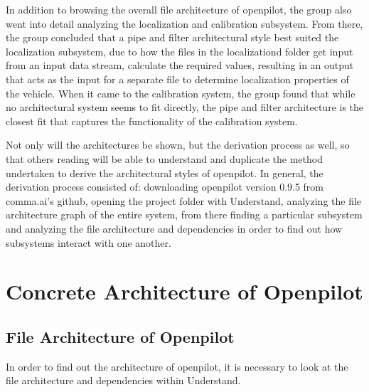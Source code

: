 \documentclass[12pt]{article}
\begin{document}
In addition to browsing the overall file architecture of openpilot, the group also went into detail analyzing the localization and calibration subsystem. From there, the group concluded that a pipe and filter architectural style best suited the localization subsystem, due to how the files in the localizationd folder get input from an input data stream, calculate the required values, resulting in an output that acts as the input for a separate file to determine localization properties of the vehicle. When it came to the calibration system, the group found that while no architectural system seems to fit directly, the pipe and filter architecture is the closest fit that captures the functionality of the calibration system.

Not only will the architectures be shown, but the derivation process as well, so that others reading will be able to understand and duplicate the method undertaken to derive the architectural styles of openpilot. In general, the derivation process consisted of: downloading openpilot version 0.9.5 from comma.ai's github, opening the project folder with Understand, analyzing the file architecture graph of the entire system, from there finding a particular subsystem and analyzing the file architecture and dependencies in order to find out how subsystems interact with one another.

\section{Concrete Architecture of Openpilot}

\subsection{File Architecture of Openpilot}

In order to find out the architecture of openpilot, it is necessary to look at the file architecture and dependencies within Understand.
\end{document}
